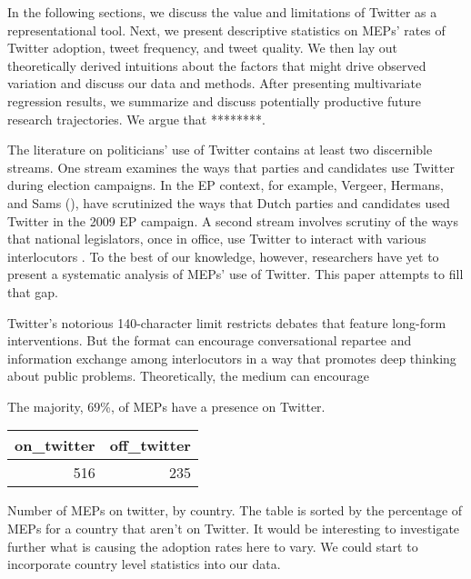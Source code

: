 \documentclass{article}\usepackage[]{graphicx}\usepackage[]{color}
\begin{document}
	In the following sections, we discuss the value and limitations of Twitter as a representational tool. Next, we present descriptive statistics on MEPs' rates of Twitter adoption, tweet frequency, and tweet quality. We then lay out theoretically derived intuitions about the factors that might drive observed variation and discuss our data and methods. After presenting multivariate regression results, we summarize and discuss potentially productive future research trajectories. We argue that ********.



 

The literature on politicians' use of Twitter contains at least two discernible streams. One stream examines the ways that parties and candidates use Twitter during election campaigns. In the EP context, for example, Vergeer, Hermans, and Sams (\citeyear{vergeer.hermans.sams.2011,vergeer.hermans.sams.2013}), have scrutinized the ways that Dutch parties and candidates used Twitter in the 2009 EP campaign. A second stream involves scrutiny of the ways that national legislators, once in office, use Twitter to interact with various interlocutors \citep*{ausserhofer.maireder.2013, chi.yang.2010, glass man.strauss.shogan.2013, larsson.kalsnes.2014, peterson.2012, shogun.2010, williams.gulati.2010}. To the best of our knowledge, however, researchers have yet to present a systematic analysis of MEPs' use of Twitter. This paper attempts to fill that gap.

Twitter's notorious 140-character limit restricts debates that feature long-form interventions. But the format can encourage conversational repartee and information exchange among interlocutors in a way that promotes deep thinking about public problems. Theoretically, the medium can encourage  



The majority, 69\%, of MEPs have a presence on Twitter. 
\begin{table}[ht]
\centering
\begin{tabular}{rr}
  \hline
on\_twitter & off\_twitter \\ 
  \hline
516 & 235 \\ 
   \hline
\end{tabular}
\end{table}

Number of MEPs on twitter, by country. The table is sorted by the percentage of MEPs for a country that aren't on Twitter. It would be interesting to investigate further what is causing the adoption rates here to vary. We could start to incorporate country level statistics into our data.
\end{document}
